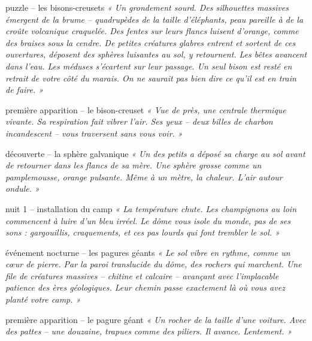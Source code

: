 \documentclass[10pt, a4paper]{article}
\begin{document}
\begin{puzzlebox}{puzzle -- les bisons-creusets}
\textit{« Un grondement sourd. Des silhouettes massives émergent de la brume -- quadrupèdes de la taille d'éléphants, peau pareille à de la croûte volcanique craquelée. Des fentes sur leurs flancs luisent d'orange, comme des braises sous la cendre. De petites créatures glabres entrent et sortent de ces ouvertures, déposent des sphères luisantes au sol, y retournent. Les bêtes avancent dans l'eau. Les méduses s'écartent sur leur passage. Un seul bison est resté en retrait de votre côté du marais. On ne saurait pas bien dire ce qu'il est en train de faire. »}
\end{puzzlebox}

\begin{creaturebox}{première apparition -- le bison-creuset}
\textit{« Vue de près, une centrale thermique vivante. Sa respiration fait vibrer l'air. Ses yeux -- deux billes de charbon incandescent -- vous traversent sans vous voir. »}
\end{creaturebox}

\begin{momentbox}{découverte -- la sphère galvanique}
\textit{« Un des petits a déposé sa charge au sol avant de retourner dans les flancs de sa mère. Une sphère grosse comme un pamplemousse, orange pulsante. Même à un mètre, la chaleur. L'air autour ondule. »}
\end{momentbox}

\begin{transitionbox}{nuit 1 -- installation du camp}
\textit{« La température chute. Les champignons au loin commencent à luire d'un bleu irréel. Le dôme vous isole du monde, pas de ses sons : gargouillis, craquements, et ces pas lourds qui font trembler le sol. »}
\end{transitionbox}

\begin{momentbox}{événement nocturne -- les pagures géants}
\textit{« Le sol vibre en rythme, comme un cœur de pierre. Par la paroi translucide du dôme, des rochers qui marchent. Une file de créatures massives -- chitine et calcaire -- avançant avec l'implacable patience des ères géologiques. Leur chemin passe exactement là où vous avez planté votre camp. »}
\end{momentbox}

\begin{creaturebox}{première apparition -- le pagure géant}
\textit{« Un rocher de la taille d'une voiture. Avec des pattes -- une douzaine, trapues comme des piliers. Il avance. Lentement. »}
\end{creaturebox}
\end{document}
